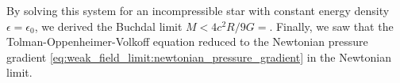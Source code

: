 By solving this system for an incompressible star with constant energy density $\epsilon = \epsilon_0$, we derived the Buchdal limit $M < 4 c^2 R / 9 G = $.
Finally, we saw that the Tolman-Oppenheimer-Volkoff equation reduced to the Newtonian pressure gradient \eqref{eq:weak_field_limit:newtonian_pressure_gradient} in the Newtonian limit.

